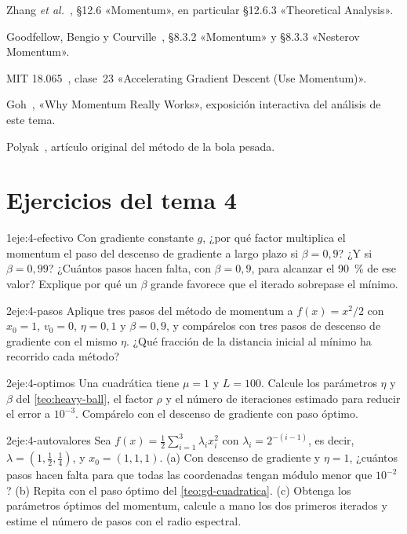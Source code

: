 \begin{lecturas}
\item Zhang \emph{et al.}~\cite{d2l}, §12.6 «Momentum», en particular §12.6.3 «Theoretical Analysis».
\item Goodfellow, Bengio y Courville~\cite{gbc}, §8.3.2 «Momentum» y §8.3.3 «Nesterov Momentum».
\item MIT 18.065~\cite{mit18065}, clase~23 «Accelerating Gradient Descent (Use Momentum)».
\item Goh~\cite{goh}, «Why Momentum Really Works», exposición interactiva del análisis de este tema.
\item Polyak~\cite{polyak}, artículo original del método de la bola pesada.
\end{lecturas}

\section*{Ejercicios del tema 4}

\begin{ejercicio}{1}{eje:4-efectivo}
Con gradiente constante $g$, ¿por qué factor multiplica el momentum el paso del descenso de gradiente a largo plazo si $\beta=0{,}9$? ¿Y si $\beta=0{,}99$? ¿Cuántos pasos hacen falta, con $\beta=0{,}9$, para alcanzar el 90~\% de ese valor? Explique por qué un $\beta$ grande favorece que el iterado sobrepase el mínimo.
\end{ejercicio}

\begin{ejercicio}{2}{eje:4-pasos}
Aplique tres pasos del método de momentum a $f(x)=x^{2}/2$ con $x_0=1$, $v_0=0$, $\eta=0{,}1$ y $\beta=0{,}9$, y compárelos con tres pasos de descenso de gradiente con el mismo $\eta$. ¿Qué fracción de la distancia inicial al mínimo ha recorrido cada método?
\end{ejercicio}

\begin{ejercicio}{2}{eje:4-optimos}
Una cuadrática tiene $\mu=1$ y $L=100$. Calcule los parámetros $\eta$ y $\beta$ del \cref{teo:heavy-ball}, el factor $\rho$ y el número de iteraciones estimado para reducir el error a $10^{-3}$. Compárelo con el descenso de gradiente con paso óptimo.
\end{ejercicio}

\begin{ejercicio}{2}{eje:4-autovalores}
Sea $f(x)=\frac12\sum_{i=1}^{3}\lambda_i x_i^{2}$ con $\lambda_i=2^{-(i-1)}$, es decir, $\lambda=(1,\tfrac12,\tfrac14)$, y $x_0=(1,1,1)$. (a) Con descenso de gradiente y $\eta=1$, ¿cuántos pasos hacen falta para que todas las coordenadas tengan módulo menor que $10^{-2}$? (b) Repita con el paso óptimo del \cref{teo:gd-cuadratica}. (c) Obtenga los parámetros óptimos del momentum, calcule a mano los dos primeros iterados y estime el número de pasos con el radio espectral.
\end{ejercicio}

